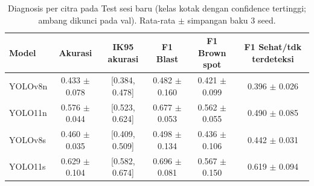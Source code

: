 \begin{table}[!t]
\centering
\caption{Diagnosis per citra pada Test sesi baru (kelas kotak dengan confidence tertinggi; ambang dikunci pada val). Rata-rata $\pm$ simpangan baku 3 seed.}
\label{tab:diagnosis_test_new_session_dengan_background}
\footnotesize
\begin{tabular}{lccccc}
\hline
\textbf{Model} & \textbf{Akurasi} & \textbf{IK95 akurasi} & \textbf{F1 Blast} & \textbf{F1 Brown spot} & \textbf{F1 Sehat/tdk terdeteksi} \\
\hline
YOLOv8n & 0.433 $\pm$ 0.078 & [0.384, 0.478] & 0.482 $\pm$ 0.160 & 0.421 $\pm$ 0.099 & 0.396 $\pm$ 0.026 \\
YOLO11n & 0.576 $\pm$ 0.044 & [0.523, 0.624] & 0.677 $\pm$ 0.053 & 0.562 $\pm$ 0.055 & 0.490 $\pm$ 0.085 \\
YOLOv8s & 0.460 $\pm$ 0.035 & [0.409, 0.509] & 0.498 $\pm$ 0.134 & 0.436 $\pm$ 0.106 & 0.442 $\pm$ 0.031 \\
YOLO11s & 0.629 $\pm$ 0.104 & [0.582, 0.674] & 0.696 $\pm$ 0.081 & 0.567 $\pm$ 0.150 & 0.619 $\pm$ 0.094 \\
\hline
\end{tabular}
\end{table}
